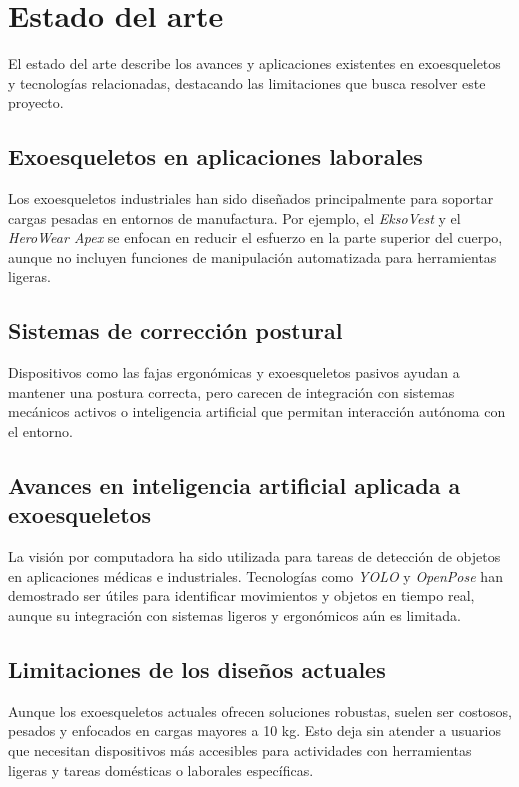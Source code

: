 \section{Estado del arte}
El estado del arte describe los avances y aplicaciones existentes en exoesqueletos y tecnologías relacionadas, destacando las limitaciones que busca resolver este proyecto.

\subsection{Exoesqueletos en aplicaciones laborales}
Los exoesqueletos industriales han sido diseñados principalmente para soportar cargas pesadas en entornos de manufactura. Por ejemplo, el \textit{EksoVest} y el \textit{HeroWear Apex} se enfocan en reducir el esfuerzo en la parte superior del cuerpo, aunque no incluyen funciones de manipulación automatizada para herramientas ligeras.

\subsection{Sistemas de corrección postural}
Dispositivos como las fajas ergonómicas y exoesqueletos pasivos ayudan a mantener una postura correcta, pero carecen de integración con sistemas mecánicos activos o inteligencia artificial que permitan interacción autónoma con el entorno.

\subsection{Avances en inteligencia artificial aplicada a exoesqueletos}
La visión por computadora ha sido utilizada para tareas de detección de objetos en aplicaciones médicas e industriales. Tecnologías como \textit{YOLO} y \textit{OpenPose} han demostrado ser útiles para identificar movimientos y objetos en tiempo real, aunque su integración con sistemas ligeros y ergonómicos aún es limitada.

\subsection{Limitaciones de los diseños actuales}
Aunque los exoesqueletos actuales ofrecen soluciones robustas, suelen ser costosos, pesados y enfocados en cargas mayores a 10 kg. Esto deja sin atender a usuarios que necesitan dispositivos más accesibles para actividades con herramientas ligeras y tareas domésticas o laborales específicas.

